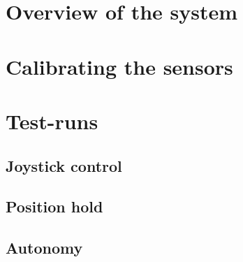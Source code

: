 \section{Overview of the system}
\section{Calibrating the sensors}
\section{Test-runs}
\subsection{Joystick control}
\subsection{Position hold}
\subsection{Autonomy}